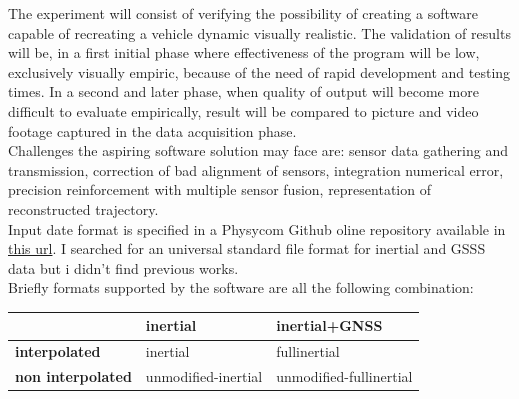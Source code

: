 \begin{flushleft}

The experiment will consist of verifying the possibility of creating a software capable of recreating a vehicle dynamic visually realistic.
The validation of results will be, in a first initial phase where effectiveness of the program will be low, exclusively visually empiric, because of the need of rapid development and testing times. In a second and later phase, when quality of output will become more difficult to evaluate empirically, result will be compared to picture and video footage captured in the data acquisition phase. \\

Challenges the aspiring software solution may face are: sensor data gathering and transmission, correction of bad alignment of sensors, integration numerical error, precision reinforcement with multiple sensor fusion, representation of reconstructed trajectory. \\

Input date format is specified in a Physycom Github oline repository available in \href{https://github.com/physycom/file_format_specifications/blob/master/formati_file.md}{this url}. I searched for an universal standard file format for inertial and GSSS data but i didn't find previous works. \\
Briefly formats supported by the software are all the following combination:
\end{flushleft}

\begin{center}
\begin{table}[H]
\begin{tabular}{l|l|l|}
\cline{2-3}
 & \textbf{inertial} & \textbf{inertial+GNSS} \\ \hline
\multicolumn{1}{|l|}{\textbf{interpolated}} & inertial & fullinertial \\ \hline
\multicolumn{1}{|l|}{\textbf{non interpolated}} & unmodified-inertial & unmodified-fullinertial \\ \hline
\end{tabular}
\end{table}

\end{center}


